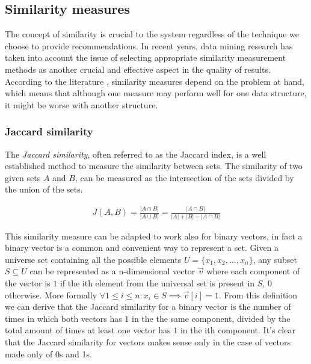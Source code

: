 \subsection{Similarity measures} \label{similatrity_measures}
The concept of similarity is crucial to the system regardless of the technique we choose to provide recommendations.  
In recent years, data mining research has taken into account the issue of selecting appropriate similarity measurement methods as another crucial and effective aspect in the quality of results. According to the literature \cite{similarity_approaches}, similarity measures depend on the problem at hand, which means that although one measure may perform well for one data structure, it might be worse with another structure. 

\subsubsection{Jaccard similarity}\label{similarity_measure_jaccard}
The \emph{Jaccard similarity}, often referred to as the Jaccard index, is a well established method to measure the similarity between sets. The similarity of two given sets $A$ and $B$, can be measured as the intersection of the sets divided by the union of the sets.

\begin{equation}
\begin{aligned}
J(A,B) = \frac{|A \cap B|}{|A \cup B|} = \frac{|A \cap B|}{|A| + |B| - |A \cap B|}
\end{aligned}
\end{equation}

This similarity measure can be adapted to work also for binary vectors, in fact a binary vector is a common and convenient way to represent a set. Given a universe set containing all the possible elements $U=\{x_1, x_2, ..., x_n\}$, any subset $S \subseteq U$ can be represented as a n-dimensional vector $\vec{v}$ where each component of the vector is $1$ if the ith element from the universal set is present in $S$, $0$ otherwise. More formally $\forall 1 \leq i \leq n \colon x_i \in S \implies \vec{v}[i] = 1$. From this definition we can derive that the Jaccard similarity for a binary vector is the number of times in which both vectors has $1$ in the the same component, divided by the total amount of times at least one vector has $1$ in the ith component. It's clear that the Jaccard similarity for vectors makes sense only in the case of vectors made only of 0s and 1s.

